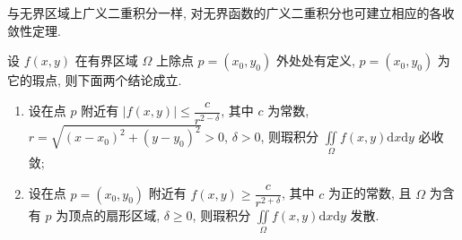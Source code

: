 与无界区域上广义二重积分一样, 对无界函数的广义二重积分也可建立相应的各收敛性定理.

\begin{example}\label{ex:10.6.4}
设 $f(x,y)$ 在有界区域 $\Omega$ 上除点 $p = (x_{0}, y_{0})$ 外处处有定义,
$p = (x_{0}, y_{0})$ 为它的瑕点, 则下面两个结论成立.
\begin{enumerate}
\item[(1)] 设在点 $p$ 附近有 $\left| f(x,y) \right| \leqslant \dfrac{c}{r^{2-\delta}}$,
其中 $c$ 为常数, $r = \sqrt{(x-x_{0})^{2} + (y-y_{0})^{2}} > 0$, $\delta > 0$,
则瑕积分 $\iint\limits_{\Omega} f(x,y) \mathrm{d}x\mathrm{d}y$ 必收敛;
\item[(2)] 设在点 $p = (x_{0}, y_{0})$ 附近有 $f(x,y) \geqslant \dfrac{c}{r^{2+\delta}}$,
其中 $c$ 为正的常数, 且 $\Omega$ 为含有 $p$ 为顶点的扇形区域, $\delta \geqslant 0$,
则瑕积分 $\iint\limits_{\Omega} f(x,y) \mathrm{d}x\mathrm{d}y$ 发散.
\end{enumerate}
\end{example}

